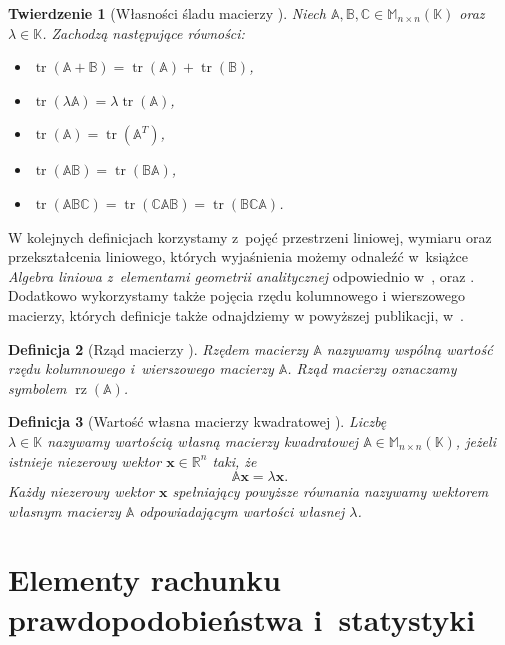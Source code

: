 \documentclass[12pt,a4paper]{report}
\newtheorem{df}{Definicja}[chapter]
\newtheorem{tw}[df]{Twierdzenie}
\newcommand{\setR}{\mathbb{R}}
\newcommand{\setK}{\mathbb{K}}
\newcommand{\rz}[1]{\operatorname{rz}\left({#1} \right)}
\newcommand{\tr}[1]{\operatorname{tr}\left({#1} \right)}
\begin{document}
\begin{tw}[Własności śladu macierzy {\citep[Sec 6.4]{ealIII}}]
Niech $\mathbb{A}, \mathbb{B}, \mathbb{C} \in \mathbb{M}_{n \times n} (\setK)$ oraz $\lambda \in \setK$.
Zachodzą następujące równości:
\begin{itemize}
\item $\tr{\mathbb{A} + \mathbb{B}} = \tr{\mathbb{A}} + \tr{\mathbb{B}}$,
\item $\tr{\lambda \mathbb{A}} = \lambda \tr{\mathbb{A}}$,
\item $\tr{\mathbb{A}} =\tr{\mathbb{A}^T}$,
\item $\tr{\mathbb{A} \mathbb{B}}  = \tr{\mathbb{B} \mathbb{A}} $,
\item $\tr{\mathbb{A} \mathbb{B} \mathbb{C}}  = \tr{\mathbb{C} \mathbb{A} \mathbb{B}} = \tr{\mathbb{B} \mathbb{C} \mathbb{A}}$.
\end{itemize}
\end{tw}

W kolejnych definicjach korzystamy z~pojęć przestrzeni liniowej, wymiaru oraz przekształcenia liniowego, których wyjaśnienia możemy odnaleźć w~książce \textit{Algebra liniowa z~elementami geometrii analitycznej} odpowiednio w~{\citep[Sec 7.1]{alzega}}, {\citep[Sec 7.5]{alzega}} oraz {\citep[Sec 9.1]{alzega}}. Dodatkowo wykorzystamy także pojęcia rzędu kolumnowego i wierszowego macierzy, których definicje także odnajdziemy w powyższej publikacji, w~{\citep[Sec 8.1]{alzega}}.

\begin{df}[Rząd macierzy {\citep[Sec 8.1]{alzega}}]
Rzędem macierzy $\mathbb{A}$ nazywamy wspólną wartość rzędu kolumnowego i~wierszowego macierzy $\mathbb{A}$. Rząd macierzy oznaczamy symbolem $\rz{\mathbb{A}}$.
\end{df}


\begin{df}[Wartość własna macierzy kwadratowej {\citep[Sec 13.1]{ealIII}}]
Liczbę 
\\$\lambda\in \setK$ nazywamy wartością własną macierzy kwadratowej $\mathbb{A} \in \mathbb{M}_{n \times n} (\setK)$, jeżeli istnieje niezerowy wektor $\mathbf{x} \in \setR^n$ taki, że
$$
\mathbb{A}\mathbf{x}=\lambda\mathbf{x}.
$$
Każdy niezerowy wektor $\mathbf{x}$ spełniający powyższe równania nazywamy wektorem własnym macierzy $\mathbb{A}$ odpowiadającym wartości własnej $\lambda$.
\end{df}


\section{Elementy rachunku prawdopodobieństwa i~statystyki}
\end{document}
